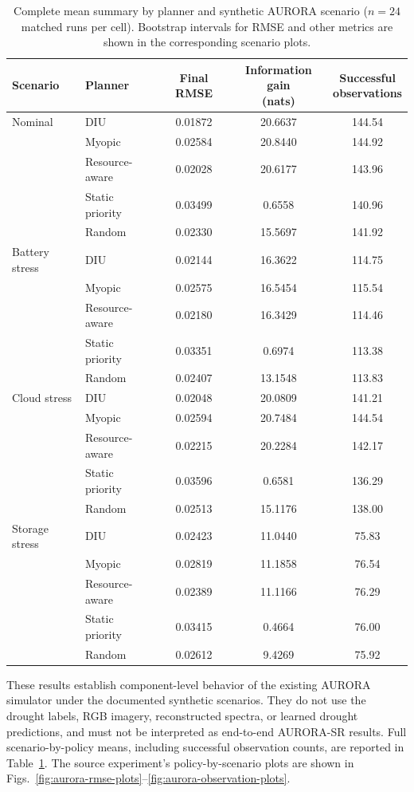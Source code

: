 \documentclass[11pt,a4paper]{article}
\begin{document}
\begin{table}[!htbp]
\centering
\small
\caption{Complete mean summary by planner and synthetic AURORA
scenario ($n=24$ matched runs per cell). Bootstrap intervals for
RMSE and other metrics are shown in the corresponding scenario plots.}
\label{tab:aurora-all-results}
\begin{tabularx}{\textwidth}{lXccc}
\toprule
Scenario & Planner & Final RMSE &
\shortstack{Information gain\\(nats)} &
\shortstack{Successful\\observations}\\
\midrule
Nominal & DIU & 0.01872 & 20.6637 & 144.54\\
 & Myopic & 0.02584 & 20.8440 & 144.92\\
 & Resource-aware & 0.02028 & 20.6177 & 143.96\\
 & Static priority & 0.03499 & 0.6558 & 140.96\\
 & Random & 0.02330 & 15.5697 & 141.92\\
\midrule
Battery stress & DIU & 0.02144 & 16.3622 & 114.75\\
 & Myopic & 0.02575 & 16.5454 & 115.54\\
 & Resource-aware & 0.02180 & 16.3429 & 114.46\\
 & Static priority & 0.03351 & 0.6974 & 113.38\\
 & Random & 0.02407 & 13.1548 & 113.83\\
\midrule
Cloud stress & DIU & 0.02048 & 20.0809 & 141.21\\
 & Myopic & 0.02594 & 20.7484 & 144.54\\
 & Resource-aware & 0.02215 & 20.2284 & 142.17\\
 & Static priority & 0.03596 & 0.6581 & 136.29\\
 & Random & 0.02513 & 15.1176 & 138.00\\
\midrule
Storage stress & DIU & 0.02423 & 11.0440 & 75.83\\
 & Myopic & 0.02819 & 11.1858 & 76.54\\
 & Resource-aware & 0.02389 & 11.1166 & 76.29\\
 & Static priority & 0.03415 & 0.4664 & 76.00\\
 & Random & 0.02612 & 9.4269 & 75.92\\
\bottomrule
\end{tabularx}
\end{table}

These results establish component-level behavior of the existing
AURORA simulator under the documented synthetic scenarios. They do
not use the drought labels, RGB imagery, reconstructed spectra, or
learned drought predictions, and must not be interpreted as
end-to-end AURORA-SR results.
Full scenario-by-policy means, including successful observation
counts, are reported in Table~\ref{tab:aurora-all-results}. The
source experiment's policy-by-scenario plots are shown in
Figs.~\ref{fig:aurora-rmse-plots}--\ref{fig:aurora-observation-plots}.
\end{document}
